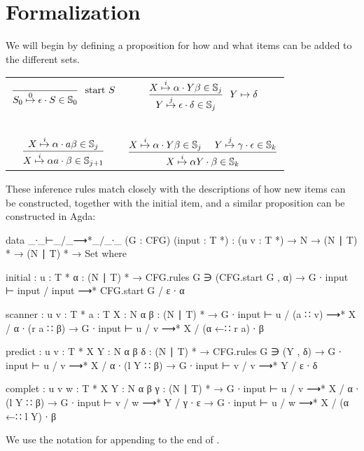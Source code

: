 	\section{Formalization}

		We will begin by defining a proposition for how and what items can be
		added to the different sets.

		\begin{table}[h]
			\centering
			\begin{tabular}{cc}
				\( \displaystyle \frac{}
					{\earley{S_0}{\epsilon}{S}{0} \in \mathbb{S}_0}
					~~\textrm{start } S
					\) &
				\( \displaystyle \frac
					{\earley{X}{\alpha}{Y\beta}{i} \in \mathbb{S}_j}
					{\earley{Y}{\epsilon}{\delta}{j} \in \mathbb{S}_j}
					~~Y \mapsto \delta
					\)
				\\~&~\\
				\( \displaystyle \frac
					{\earley{X}{\alpha}{a\beta}{i} \in \mathbb{S}_j}
					{\earley{X}{\alpha a}{\beta}{i} \in \mathbb{S}_{j+1}}
					\) &
				\( \displaystyle \frac
					{
						\earley{X}{\alpha}{Y\beta}{i} \in \mathbb{S}_j~~~~
						\earley{Y}{\gamma}{\epsilon}{j} \in \mathbb{S}_k
						}
					{\earley{X}{\alpha Y}{\beta}{i} \in \mathbb{S}_k}
					\)
			\end{tabular}
		\end{table}

		These inference rules match closely with the descriptions of how new
		items can be constructed, together with the initial item, and a similar
		proposition can be constructed in Agda:

		\begin{code}
			data _∙_⊢_/_⟶*_/_∙_ (G : CFG) (input : T *) :
			  (u v : T *) → N → (N ∣ T) * → (N ∣ T) * → Set where

			  initial : {u : T *} {α : (N ∣ T) *} →
			    CFG.rules G ∋ (CFG.start G , α) →
			    G ∙ input ⊢ input / input ⟶* CFG.start G / ε ∙ α

			  scanner : {u v : T *} {a : T} {X : N} {α β : (N ∣ T) *} →
			    G ∙ input ⊢ u / (a ∷ v) ⟶* X / α ∙ (r a ∷ β) →
			    G ∙ input ⊢ u / v ⟶* X / (α ←∷ r a) ∙ β

			  predict : {u v : T *} {X Y : N} {α β δ : (N ∣ T) *} →
			    CFG.rules G ∋ (Y , δ) →
			    G ∙ input ⊢ u / v ⟶* X / α ∙ (l Y ∷ β) →
			    G ∙ input ⊢ v / v ⟶* Y / ε ∙ δ

			  complet : {u v w : T *} {X Y : N} {α β γ : (N ∣ T) *} →
			    G ∙ input ⊢ u / v ⟶* X / α ∙ (l Y ∷ β) →
			    G ∙ input ⊢ v / w ⟶* Y / γ ∙ ε →
			    G ∙ input ⊢ u / w ⟶* X / (α ←∷ l Y) ∙ β
		\end{code}
		We use the notation  for appending  to the
		end of .

